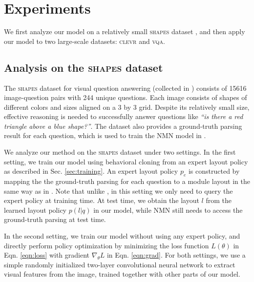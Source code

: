 \documentclass[10pt,twocolumn,letterpaper]{article}
\newcommand{\shapes}{\textsc{shapes}\xspace}
\newcommand{\clevr}{\textsc{clevr}\xspace}
\newcommand{\vqa}{\textsc{vqa}\xspace}
\begin{document}
\section{Experiments}

We first analyze our model on a relatively small \shapes dataset \cite{andreas16neural}, and then apply our model to two large-scale datasets: \clevr \cite{johnson2017clevr} and \vqa \cite{antol15iccv}.

\subsection{Analysis on the \shapes dataset}
\label{sec:exp_shapes}

The \shapes dataset for visual question answering (collected in \cite{andreas16neural}) consists of 15616 image-question pairs with 244 unique questions. Each image consists of shapes of different colors and sizes aligned on a 3 by 3 grid. Despite its relatively small size, effective reasoning is needed to successfully answer questions like \textit{``is there a red triangle above a blue shape?''}. The dataset also provides a ground-truth parsing result for each question, which is used to train the NMN model in \cite{andreas16neural}.

We analyze our method on the \shapes dataset under two settings.
In the first setting, we train our model using behavioral cloning from an expert layout policy as described in Sec. \ref{sec:training}. An expert layout policy $p_e$ is constructed by mapping the the ground-truth parsing for each question to a module layout in the same way as in \cite{andreas16neural}. Note that unlike \cite{andreas16neural}, in this setting we only need to query the expert policy at training time. At test time, we obtain the layout $l$ from the learned layout policy $p(l | q)$ in our model, while NMN \cite{andreas16neural} still needs to access the ground-truth parsing at test time.

In the second setting, we train our model without using any expert policy, and directly perform policy optimization by minimizing the loss function $L(\theta)$ in Eqn. \ref{eqn:loss} with gradient $\nabla_\theta L$ in Eqn. \ref{eqn:grad}. For both settings, we use a simple randomly initialized two-layer convolutional neural network to extract visual features from the image, trained together with other parts of our model.
\end{document}
